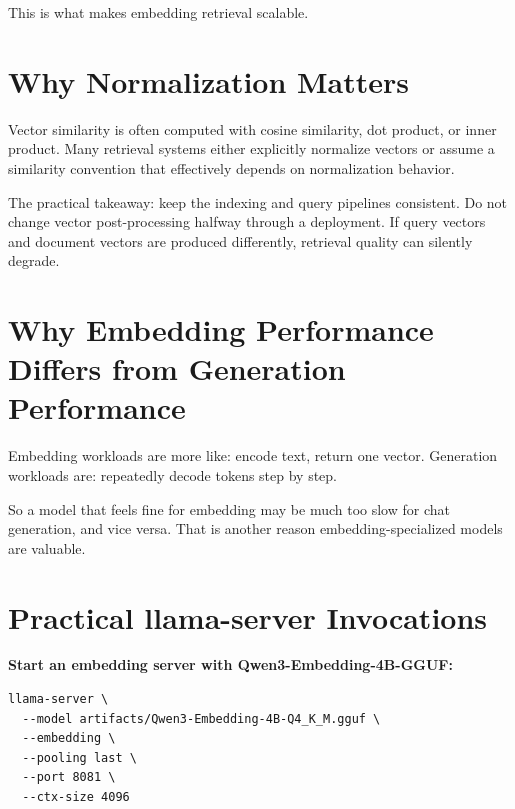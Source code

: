 This is what makes embedding retrieval scalable.

\section{Why Normalization Matters}

Vector similarity is often computed with cosine similarity, dot product, or inner product.
Many retrieval systems either explicitly normalize vectors or assume a similarity convention
that effectively depends on normalization behavior.

The practical takeaway: keep the indexing and query pipelines consistent. Do not change vector
post-processing halfway through a deployment. If query vectors and document vectors are
produced differently, retrieval quality can silently degrade.

\section{Why Embedding Performance Differs from Generation Performance}

Embedding workloads are more like: encode text, return one vector. Generation workloads are:
repeatedly decode tokens step by step.

So a model that feels fine for embedding may be much too slow for chat generation, and vice
versa. That is another reason embedding-specialized models are valuable.

\section{Practical llama-server Invocations}

\textbf{Start an embedding server with Qwen3-Embedding-4B-GGUF:}

\begin{Verbatim}
llama-server \
  --model artifacts/Qwen3-Embedding-4B-Q4_K_M.gguf \
  --embedding \
  --pooling last \
  --port 8081 \
  --ctx-size 4096
\end{Verbatim}

